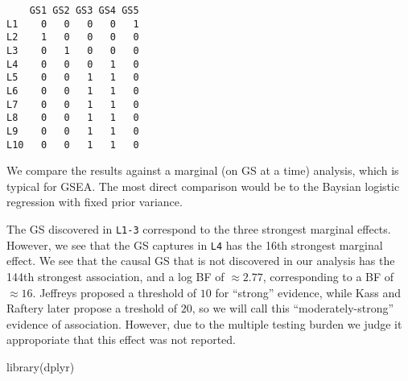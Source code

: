 \documentclass[
  letterpaper,
  DIV=11,
  numbers=noendperiod]{scrreprt}
\newenvironment{Shaded}{\begin{snugshade}}{\end{snugshade}}
\newcommand{\CommentTok}[1]{\textcolor[rgb]{0.37,0.37,0.37}{#1}}
\newcommand{\DecValTok}[1]{\textcolor[rgb]{0.68,0.00,0.00}{#1}}
\newcommand{\FunctionTok}[1]{\textcolor[rgb]{0.28,0.35,0.67}{#1}}
\newcommand{\NormalTok}[1]{\textcolor[rgb]{0.00,0.23,0.31}{#1}}
\newcommand{\OtherTok}[1]{\textcolor[rgb]{0.00,0.23,0.31}{#1}}
\newcommand{\SpecialCharTok}[1]{\textcolor[rgb]{0.37,0.37,0.37}{#1}}
\newcommand{\StringTok}[1]{\textcolor[rgb]{0.13,0.47,0.30}{#1}}
\begin{document}
\begin{Shaded}
\end{Shaded}

\begin{verbatim}
    GS1 GS2 GS3 GS4 GS5
L1    0   0   0   0   1
L2    1   0   0   0   0
L3    0   1   0   0   0
L4    0   0   0   1   0
L5    0   0   1   1   0
L6    0   0   1   1   0
L7    0   0   1   1   0
L8    0   0   1   1   0
L9    0   0   1   1   0
L10   0   0   1   1   0
\end{verbatim}

We compare the results against a marginal (on GS at a time) analysis,
which is typical for GSEA. The most direct comparison would be to the
Baysian logistic regression with fixed prior variance.

The GS discovered in \texttt{L1-3} correspond to the three strongest
marginal effects. However, we see that the GS captures in \texttt{L4}
has the 16th strongest marginal effect. We see that the causal GS that
is not discovered in our analysis has the 144th strongest association,
and a log BF of \(\approx 2.77\), corresponding to a BF of
\(\approx 16\). Jeffreys proposed a threshold of \(10\) for ``strong''
evidence, while Kass and Raftery later propose a treshold of \(20\), so
we will call this ``moderately-strong'' evidence of association.
However, due to the multiple testing burden we judge it approporiate
that this effect was not reported.

\begin{Shaded}
\begin{Highlighting}[]
\FunctionTok{library}\NormalTok{(dplyr)}
\end{Highlighting}
\end{Shaded}
\end{document}
